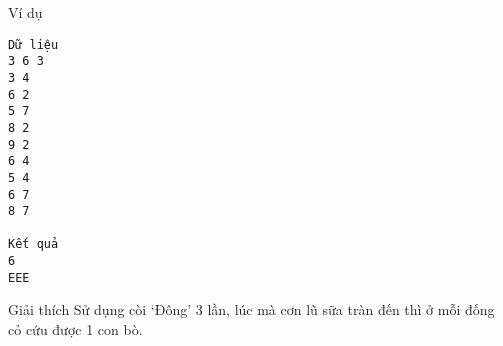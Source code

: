 Ví dụ
\begin{verbatim}
Dữ liệu
3 6 3
3 4
6 2
5 7
8 2
9 2
6 4
5 4
6 7
8 7

Kết quả
6
EEE
\end{verbatim}
Giải thích
Sử dụng còi ‘Đông’ 3 lần, lúc mà cơn lũ sữa tràn đến  thì ở mỗi đống cỏ cứu được 1 con bò.